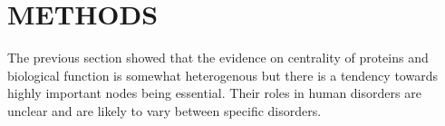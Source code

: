   
  







\section{METHODS}
The previous section showed that the evidence on centrality of proteins and biological function is somewhat heterogenous but there is a tendency towards highly important nodes being essential. Their roles in human disorders are unclear and are likely to vary between specific disorders. 
  
